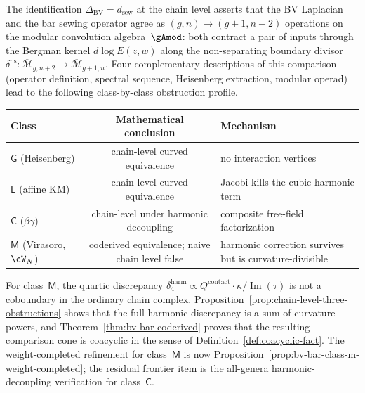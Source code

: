 \begin{remark}%
\label{rem:bv-sewing-chain-level-classes}%
%
%
%
The identification $\Delta_{\mathrm{BV}} = d_{\mathrm{sew}}$ at
the chain level asserts that the BV Laplacian and the bar sewing
operator agree as $(g,n) \to (g{+}1,n{-}2)$ operations on the
modular convolution algebra~$\gAmod$: both contract a pair of
inputs through the Bergman kernel $d\log E(z,w)$ along the
non-separating boundary divisor
$\delta^{\mathrm{ns}}\colon
\overline{\mathcal{M}}_{g,n+2} \to
\overline{\mathcal{M}}_{g+1,n}$.
Four complementary descriptions of this comparison
\textup{(}operator definition, spectral sequence, Heisenberg
extraction, modular operad\textup{)} lead to the following
class-by-class obstruction profile.
\begin{center}
\small
\renewcommand{\arraystretch}{1.15}
\begin{tabular}{lcl}
\toprule
Class & Mathematical conclusion & Mechanism \\
\midrule
$\mathsf{G}$ \textup{(}Heisenberg\textup{)}
 & chain-level curved equivalence & no interaction vertices \\
$\mathsf{L}$ \textup{(}affine KM\textup{)}
 & chain-level curved equivalence & Jacobi kills the cubic harmonic term \\
$\mathsf{C}$ \textup{(}$\beta\gamma$\textup{)}
 & chain-level under harmonic decoupling & composite free-field factorization \\
$\mathsf{M}$ \textup{(}Virasoro, $\cW_N$\textup{)}
 & coderived equivalence; naive chain level false & harmonic correction survives but is curvature-divisible \\
\bottomrule
\end{tabular}
\end{center}
For class~$\mathsf{M}$, the quartic discrepancy
$\delta_4^{\mathrm{harm}} \propto Q^{\mathrm{contact}} \cdot
\kappa / \operatorname{Im}(\tau)$ is not a coboundary
in the ordinary chain complex. Proposition~\ref{prop:chain-level-three-obstructions}
shows that the full harmonic discrepancy is a sum of curvature
powers, and Theorem~\ref{thm:bv-bar-coderived} proves that the
resulting comparison cone is coacyclic in the sense of
Definition~\ref{def:coacyclic-fact}. The weight-completed
refinement for class~$\mathsf{M}$ is now
Proposition~\ref{prop:bv-bar-class-m-weight-completed}; the
residual frontier item is the all-genera harmonic-decoupling
verification for class~$\mathsf{C}$.
\end{remark}

